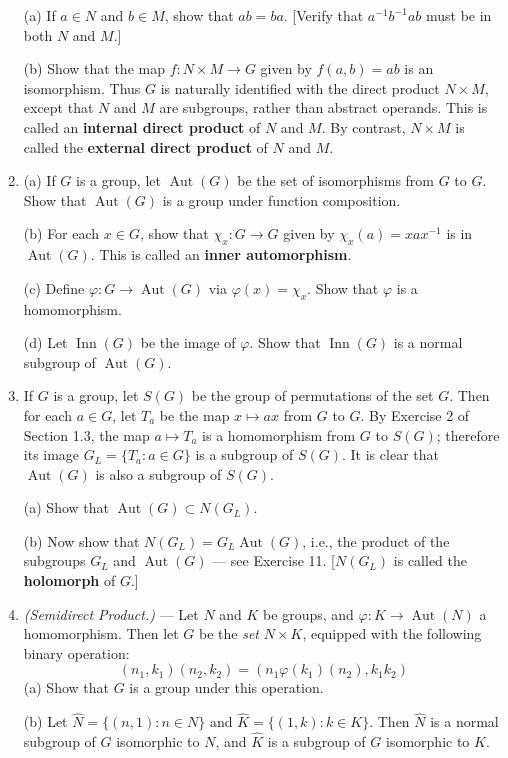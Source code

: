 \documentclass[leqno]{book}
\begin{document}
\begin{enumerate}
(a) If $a\in N$ and $b\in M$, show that $ab=ba$.  [Verify that $a^{-1}b^{-1}ab$ must be in both $N$ and $M$.]

(b) Show that the map $f:N\times M\to G$ given by $f(a,b)=ab$ is an isomorphism.  Thus $G$ is naturally identified with the direct product $N\times M$, except that $N$ and $M$ are subgroups, rather than abstract operands.  This is called an \textbf{internal direct product} of $N$ and $M$.  By contrast, $N\times M$ is called the \textbf{external direct product} of $N$ and $M$.

\item (a) If $G$ is a group, let $\operatorname{Aut}(G)$ be the set of isomorphisms from $G$ to $G$.  Show that $\operatorname{Aut}(G)$ is a group under function composition.

(b) For each $x\in G$, show that $\chi_x:G\to G$ given by $\chi_x(a)=xax^{-1}$ is in $\operatorname{Aut}(G)$.  This is called an \textbf{inner automorphism}.

(c) Define $\varphi:G\to\operatorname{Aut}(G)$ via $\varphi(x)=\chi_x$.  Show that $\varphi$ is a homomorphism.

(d) Let $\operatorname{Inn}(G)$ be the image of $\varphi$.  Show that $\operatorname{Inn}(G)$ is a normal subgroup of $\operatorname{Aut}(G)$.

\item If $G$ is a group, let $S(G)$ be the group of permutations of the set $G$.  Then for each $a\in G$, let $T_a$ be the map $x\mapsto ax$ from $G$ to $G$.  By Exercise 2 of Section 1.3, the map $a\mapsto T_a$ is a homomorphism from $G$ to $S(G)$; therefore its image $G_L=\{T_a:a\in G\}$ is a subgroup of $S(G)$.  It is clear that $\operatorname{Aut}(G)$ is also a subgroup of $S(G)$.

(a) Show that $\operatorname{Aut}(G)\subset N(G_L)$.

(b) Now show that $N(G_L)=G_L\operatorname{Aut}(G)$, i.e., the product of the subgroups $G_L$ and $\operatorname{Aut}(G)$ \---- see Exercise 11.  [$N(G_L)$ is called the \textbf{holomorph} of $G$.]

\item\emph{(Semidirect Product.)} \---- Let $N$ and $K$ be groups, and $\varphi:K\to\operatorname{Aut}(N)$ a homomorphism.  Then let $G$ be the \emph{set} $N\times K$, equipped with the following binary operation:
$$(n_1,k_1)(n_2,k_2)=(n_1\varphi(k_1)(n_2),k_1k_2)$$
(a) Show that $G$ is a group under this operation.

(b) Let $\widehat N=\{(n,1):n\in N\}$ and $\widehat K=\{(1,k):k\in K\}$.  Then $\widehat N$ is a normal subgroup of $G$ isomorphic to $N$, and $\widehat K$ is a subgroup of $G$ isomorphic to $K$.


\end{enumerate}
\end{document}
